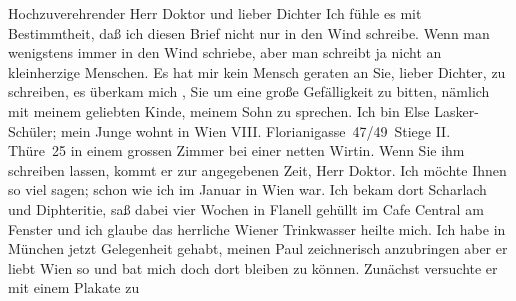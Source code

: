 \pstart\center{}Hochzuverehrender Herr Doktor und lieber Dichter\pend\vspace{0.5em}
\pstart
           Ich fühle es mit Bestimmtheit, daß ich diesen Brief nicht nur in \introOben{}den\introOben{} Wind schreibe. Wenn man wenigstens immer in den Wind schriebe, aber man
               schreibt ja nicht an kleinherzige Menschen. Es hat mir kein Mensch geraten an Sie,
               lieber Dichter, zu schreiben, es überkam mich \strikeout{\textcolor{gray}{×}}, Sie um eine große Gefälligkeit zu bitten, nämlich mit {\pb}meinem geliebten
                  Kinde, meinem Sohn zu sprechen. Ich bin
               Else Lasker-Schüler; mein Junge wohnt in Wien \introOben{}VIII.\introOben{} Florianigasse 47/49 Stiege II. \introOben{}Thüre 25\introOben{} in einem grossen Zimmer bei einer netten Wirtin. Wenn Sie ihm schreiben lassen, kommt er zur angegebenen Zeit, Herr Doktor. Ich
               möchte Ihnen so viel sagen; schon wie ich im Januar in
                  Wien war. Ich bekam dort Scharlach und
               Diphteritie, saß dabei vier Wochen in Flanell gehüllt im Cafe Central am Fenster und ich glaube das herrliche Wiener Trinkwasser heilte mich. Ich habe in München jetzt Gelegenheit gehabt, meinen Paul zeichnerisch anzubringen {\pb}aber er
               liebt Wien so und bat mich doch dort bleiben zu
               können. Zunächst versuchte er mit einem \label{K_L02653-1v}\label{K_L02653-1} Plakate zu

